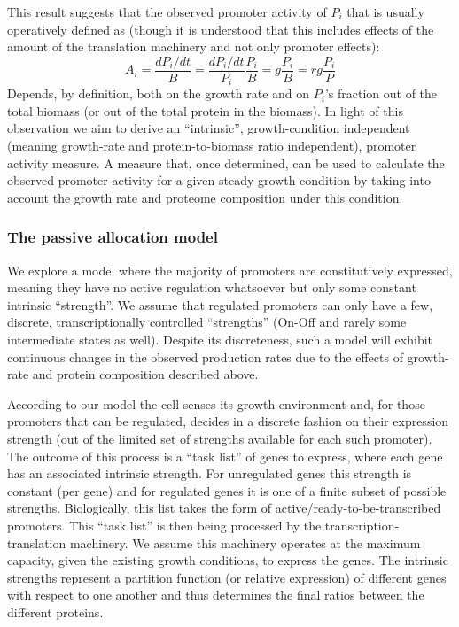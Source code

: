 \documentclass{report}
\begin{document}
This result suggests that the observed promoter activity of $P_i$ that is usually operatively defined as (though it is understood that this includes effects of the amount of the translation machinery and not only promoter effects):
\[A_i=\frac{dP_i/dt}{B}=\frac{dP_i/dt}{P_i}\frac{P_i}{B}=g\frac{P_i}{B}=rg\frac{P_i}{P}\]
Depends, by definition, both on the growth rate and on $P_i$’s fraction out of the total biomass (or out of the total protein in the biomass).
In light of this observation we aim to derive an “intrinsic”, growth-condition independent (meaning growth-rate and protein-to-biomass ratio independent), promoter activity measure.
A measure that, once determined, can be used to calculate the observed promoter activity for a given steady growth condition by taking into account the growth rate and proteome composition under this condition.
\subsubsection{The passive allocation model}
We explore a model where the majority of promoters are constitutively expressed, meaning they have no active regulation whatsoever but only some constant intrinsic “strength”.
We assume that regulated promoters can only have a few, discrete, transcriptionally controlled “strengths” (On-Off and rarely some intermediate states as well).
Despite its discreteness, such a model will exhibit continuous changes in the observed production rates due to the effects of growth-rate and protein composition described above.

According to our model the cell senses its growth environment and, for those promoters that can be regulated, decides in a discrete fashion on their expression strength (out of the limited set of strengths available for each such promoter).
The outcome of this process is a “task list” of genes to express, where each gene has an associated intrinsic strength.
For unregulated genes this strength is constant (per gene) and for regulated genes it is one of a finite subset of possible strengths.
Biologically, this list takes the form of active/ready-to-be-transcribed promoters.
This “task list” is then being processed by the transcription-translation machinery.
We assume this machinery operates at the maximum capacity, given the existing growth conditions, to express the genes.
The intrinsic strengths represent a partition function (or relative expression) of different genes with respect to one another and thus determines the final ratios between the different proteins.
\end{document}
